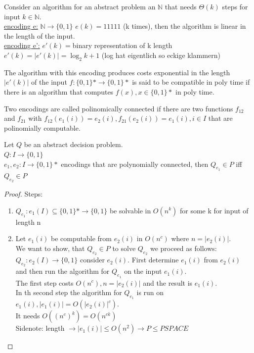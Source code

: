 \begin{example}
  Consider an algorithm for an abstract problem an $\mathbb{N}$ that needs $\Theta(k)$ steps for input $k \in \mathbb{N}$. \\
  \underline{encoding e:} $\mathbb{N} \rightarrow \{ 0,1 \}$ $e(k) = 11111$ (k times), then the algorithm is linear in the length of the input. \\
  \underline{encoding e':} $e'(k)=$binary representation of k length$e'(k) = \left| e'(k) \right| = \log_2 k +1$ (log hat eigentlich so eckige klammern)
\end{example}

The algorithm with this encoding produces costs exponential in the length $\left| e'(k) \right|$ of the input $f:\{ 0,1 \}* \rightarrow \{ 0,1 \}*$ is said to be compatible in poly time if there is an algorithm that computes $f(x), x \in \{ 0,1 \}*$ in poly time.

Two encodings are called polinomically connected if there are two functions $f_{12}$ and $f_{21}$ with $f_{12}(e_{1}(i)) = e_{2}(i), f_{21}(e_{2}(i)) = e_{1}(i), i \in I$ that are polinomially computable.\\

\begin{samepage}
\begin{lemma}
  Let $Q$ be an abstract decision problem. \\
  $Q:I \rightarrow \{ 0,1 \}$ \\
  $e_{1},e_{2}:I \rightarrow \{ 0,1 \}*$ encodings that are polynomially connected, then $Q_{e_{1}} \in P$ iff $Q_{e_{2}} \in P$
\end{lemma}
\end{samepage}

\begin{proof}
  Steps:
  \begin{enumerate}
    \item $Q_{e_{1}}: e_{1}(I) \subseteq \{ 0,1 \}* \rightarrow \{ 0,1 \}$ be solvable in $O(n^k)$ for some k for input of length n
    \item Let $e_{1}(i)$ be computable from $e_{2}(i)$ in $O(n^c)$ where $n=\left| e_{2}(i) \right|$. \\
          We want to show, that $Q_{e_{2}} \in P$ to solve $Q_{e_{2}}$ we proceed as follows: \\
          $Q_{e_{2}}: e_{2}(I) \rightarrow \{ 0,1 \}$ consider $e_{2}(i)$. First determine $e_{1}(i)$ from $e_{2}(i)$ and then run the algorithm for $Q_{e_{1}}$ on the input $e_{1}(i)$.\\
          The first step costs $O(n^c), n= \left| e_{2}(i) \right|$ and the result is $e_{1}(i)$.\\
          In th second step the algorithm for $Q_{e_{1}}$ is run on $e_{1}(i), \left| e_{1}(i) \right| = O( \left| e_{2}(i) \right|^c)$. \\
          It needs $O((n^c)^k) = O(n^{ck})$ \\
          \newline
          Sidenote: length $\rightarrow \left| e_{1}(i) \right| \leq O(n^2) \rightarrow P \leq PSPACE$
  \end{enumerate}
\end{proof}

